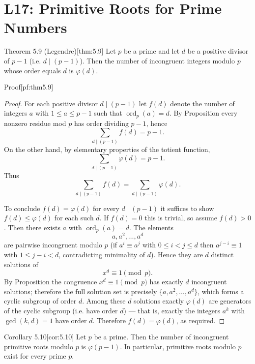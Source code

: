 \documentclass[10pt]{article}
\theoremstyle{definition}
\theoremstyle{plain}
\numberwithin{equation}{section}
\begin{document}
\section*{L17: Primitive Roots for Prime Numbers}

\begin{define}{Theorem 5.9 (Legendre)}[thm:5.9]
Let $p$ be a prime and let $d$ be a positive divisor of $p-1$ (i.e. $d\mid (p-1)$). Then the number of incongruent integers modulo $p$ whose order equals $d$ is $\varphi(d)$.
\end{define}

\begin{define}{Proof}[pf:thm5.9]
\begin{proof}
For each positive divisor $d\mid(p-1)$ let $f(d)$ denote the number of integers $a$ with $1\le a\le p-1$ such that $\operatorname{ord}_p(a)=d$. By Proposition  every nonzero residue mod $p$ has order dividing $p-1$, hence
\[
\sum_{d\mid(p-1)} f(d)=p-1.
\]
On the other hand, by elementary properties of the totient function,
\[
\sum_{d\mid(p-1)} \varphi(d)=p-1.
\]
Thus
\begin{equation}\label{eq:sumfphis}
\sum_{d\mid(p-1)} f(d)=\sum_{d\mid(p-1)} \varphi(d).
\end{equation}

To conclude $f(d)=\varphi(d)$ for every $d\mid(p-1)$ it suffices to show $f(d)\le\varphi(d)$ for each such $d$. If $f(d)=0$ this is trivial, so assume $f(d)>0$. Then there exists $a$ with $\operatorname{ord}_p(a)=d$. The elements
\[
a,a^2,\dots,a^d
\]
are pairwise incongruent modulo $p$ (if $a^i\equiv a^j$ with $0\le i<j\le d$ then $a^{j-i}\equiv 1$ with $1\le j-i<d$, contradicting minimality of $d$). Hence they are $d$ distinct solutions of
\[
x^d\equiv 1 \pmod p.
\]
By Proposition  the congruence $x^d\equiv1\pmod p$ has exactly $d$ incongruent solutions; therefore the full solution set is precisely $\{a,a^2,\dots,a^d\}$, which forms a cyclic subgroup of order $d$. Among these $d$ solutions exactly $\varphi(d)$ are generators of the cyclic subgroup (i.e. have order $d$) — that is, exactly the integers $a^k$ with $\gcd(k,d)=1$ have order $d$. Therefore $f(d)=\varphi(d)$, as required.
\end{proof}
\end{define}

\begin{define}{Corollary 5.10}[cor:5.10]
Let $p$ be a prime. Then the number of incongruent primitive roots modulo $p$ is $\varphi(p-1)$. In particular, primitive roots modulo $p$ exist for every prime $p$.
\end{define}
\end{document}
